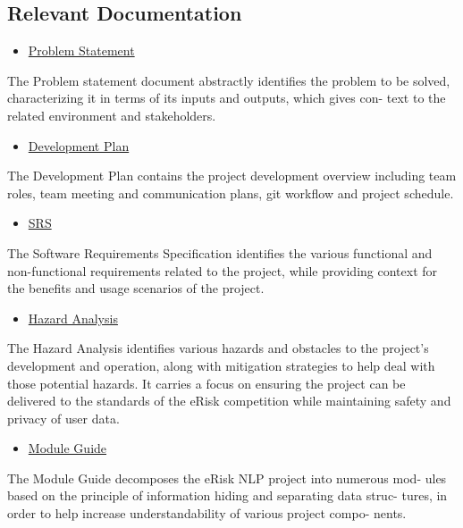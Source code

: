 \documentclass[12pt, titlepage]{article}
\begin{document}
\subsection{Relevant Documentation}
\begin{itemize}
	\item \href{https://github.com/MichaelBreau/nlp-mentalhealth/blob/main/docs/ProblemStatementAndGoals/ProblemStatement.pdf}{Problem Statement}
\end{itemize}
The Problem statement document abstractly identifies the problem to be
solved, characterizing it in terms of its inputs and outputs, which gives con-
text to the related environment and stakeholders.

\begin{itemize}
	\item \href{https://github.com/MichaelBreau/nlp-mentalhealth/blob/main/docs/DevelopmentPlan/DevelopmentPlan.pdf}{Development Plan}
\end{itemize}
The Development Plan contains the project development overview including
team roles, team meeting and communication plans, git workflow and project
schedule.

\begin{itemize}
	\item \href{https://github.com/MichaelBreau/nlp-mentalhealth/blob/main/docs/SRS-Meyer/index.pdf}{SRS}
\end{itemize}
The Software Requirements Specification identifies the various functional and
non-functional requirements related to the project, while providing context
for the benefits and usage scenarios of the project.

\begin{itemize}
	\item \href{https://github.com/MichaelBreau/nlp-mentalhealth/blob/main/docs/HazardAnalysis/HazardAnalysis.pdf}{Hazard Analysis}
\end{itemize}
The Hazard Analysis identifies various hazards and obstacles to the project’s
development and operation, along with mitigation strategies to help deal
with those potential hazards. It carries a focus on ensuring the project can
be delivered to the standards of the eRisk competition while maintaining
safety and privacy of user data.

\begin{itemize}
	\item \href{https://github.com/MichaelBreau/nlp-mentalhealth/blob/main/docs/Design/SoftArchitecture/MG.pdf}{Module Guide}
\end{itemize}
The Module Guide decomposes the eRisk NLP project into numerous mod-
ules based on the principle of information hiding and separating data struc-
tures, in order to help increase understandability of various project compo-
nents.
\end{document}
